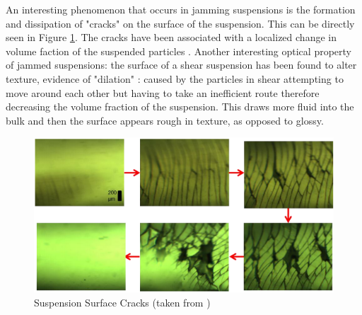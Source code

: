 \documentclass[twoside,a4]{report}
\def\br{\newline \newline \noindent}
\def\cbh{\large\bfseries !!! ??? !!! \normalsize\normalfont}
\begin{document}
	An interesting phenomenon that occurs in jamming suspensions is the formation and dissipation of "cracks" on the surface of the suspension. This can be directly seen in Figure \ref{cforscracks}. The cracks have been associated with a localized change in volume faction of the suspended particles \cite{backhawjam}. Another interesting optical property of jammed suspensions: the surface of a shear suspension has been found to alter texture, evidence of "dilation" \cite{backbrownjaegrev}: caused by the particles in shear attempting to move around each other but having to take an inefficient route therefore decreasing the volume fraction of the suspension. This draws more fluid into the bulk and then the surface appears rough in texture, as opposed to glossy. 
	\begin{figure}[!htb]
		\centering
		\includegraphics[scale=0.4]{images/cfors_cracks.png}
		\caption{Suspension Surface Cracks (taken from \cite{thescforsyth})}
		\label{cforscracks}
	\end{figure}
\end{document}
